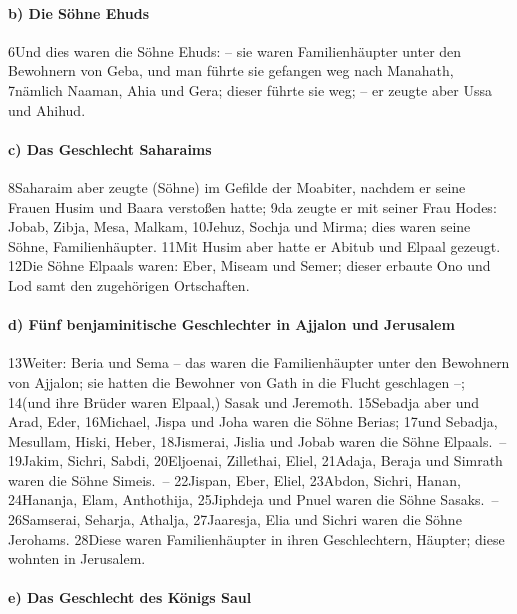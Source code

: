 \hypertarget{b-die-suxf6hne-ehuds}{%
\paragraph{b) Die Söhne Ehuds}\label{b-die-suxf6hne-ehuds}}

6Und dies waren die Söhne Ehuds: -- sie waren Familienhäupter unter den
Bewohnern von Geba, und man führte sie gefangen weg nach Manahath,
7nämlich Naaman, Ahia und Gera; dieser führte sie weg; -- er zeugte aber
Ussa und Ahihud.

\hypertarget{c-das-geschlecht-saharaims}{%
\paragraph{c) Das Geschlecht
Saharaims}\label{c-das-geschlecht-saharaims}}

8Saharaim aber zeugte (Söhne) im Gefilde der Moabiter, nachdem er seine
Frauen Husim und Baara verstoßen hatte; 9da zeugte er mit seiner Frau
Hodes: Jobab, Zibja, Mesa, Malkam, 10Jehuz, Sochja und Mirma; dies waren
seine Söhne, Familienhäupter. 11Mit Husim aber hatte er Abitub und
Elpaal gezeugt. 12Die Söhne Elpaals waren: Eber, Miseam und Semer;
dieser erbaute Ono und Lod samt den zugehörigen Ortschaften.

\hypertarget{d-fuxfcnf-benjaminitische-geschlechter-in-ajjalon-und-jerusalem}{%
\paragraph{d) Fünf benjaminitische Geschlechter in Ajjalon und
Jerusalem}\label{d-fuxfcnf-benjaminitische-geschlechter-in-ajjalon-und-jerusalem}}

13Weiter: Beria und Sema -- das waren die Familienhäupter unter den
Bewohnern von Ajjalon; sie hatten die Bewohner von Gath in die Flucht
geschlagen --; 14(und ihre Brüder waren Elpaal,) Sasak und Jeremoth.
15Sebadja aber und Arad, Eder, 16Michael, Jispa und Joha waren die Söhne
Berias; 17und Sebadja, Mesullam, Hiski, Heber, 18Jismerai, Jislia und
Jobab waren die Söhne Elpaals.~-- 19Jakim, Sichri, Sabdi, 20Eljoenai,
Zillethai, Eliel, 21Adaja, Beraja und Simrath waren die Söhne Simeis.~--
22Jispan, Eber, Eliel, 23Abdon, Sichri, Hanan, 24Hananja, Elam,
Anthothija, 25Jiphdeja und Pnuel waren die Söhne Sasaks.~-- 26Samserai,
Seharja, Athalja, 27Jaaresja, Elia und Sichri waren die Söhne Jerohams.
28Diese waren Familienhäupter in ihren Geschlechtern, Häupter; diese
wohnten in Jerusalem.

\hypertarget{e-das-geschlecht-des-kuxf6nigs-saul}{%
\paragraph{e) Das Geschlecht des Königs
Saul}\label{e-das-geschlecht-des-kuxf6nigs-saul}}


